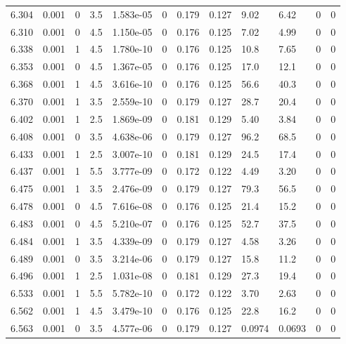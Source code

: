 \documentclass[preview]{standalone}
\begin{document}
{{{{{{\begin{tabular}{L{1.2cm}C{1.2cm} C{0.3cm}C{0.5cm} C{1.4cm}C{1.4cm} C{1.4cm}C{1.4cm} C{1.6cm}C{1.6cm} C{1.6cm}C{1.6cm}}
  6.304  &  0.001  & 0     & 3.5 &  1.583e-05  & 0  &  0.179&   0.127& 9.02 & 6.42   &  0 & 0  \\ 
  6.310  &  0.001  & 0     & 4.5 &  1.150e-05  & 0  &  0.176&   0.125& 7.02 & 4.99   &  0 & 0  \\ 
  6.338  &  0.001  & 1     & 4.5 &  1.780e-10  & 0  &  0.176&   0.125& 10.8 & 7.65   &  0 & 0  \\ 
  6.353  &  0.001  & 0     & 4.5 &  1.367e-05  & 0  &  0.176&   0.125& 17.0 & 12.1   &  0 & 0  \\ 
  6.368  &  0.001  & 1     & 4.5 &  3.616e-10  & 0  &  0.176&   0.125& 56.6 & 40.3   &  0 & 0  \\ 
  6.370  &  0.001  & 1     & 3.5 &  2.559e-10  & 0  &  0.179&   0.127& 28.7 & 20.4   &  0 & 0  \\ 
  6.402  &  0.001  & 1     & 2.5 &  1.869e-09  & 0  &  0.181&   0.129& 5.40 & 3.84   &  0 & 0  \\ 
  6.408  &  0.001  & 0     & 3.5 &  4.638e-06  & 0  &  0.179&   0.127& 96.2 & 68.5   &  0 & 0  \\ 
  6.433  &  0.001  & 1     & 2.5 &  3.007e-10  & 0  &  0.181&   0.129& 24.5 & 17.4   &  0 & 0  \\ 
  6.437  &  0.001  & 1     & 5.5 &  3.777e-09  & 0  &  0.172&   0.122& 4.49 & 3.20   &  0 & 0  \\ 
  6.475  &  0.001  & 1     & 3.5 &  2.476e-09  & 0  &  0.179&   0.127& 79.3 & 56.5   &  0 & 0  \\ 
  6.478  &  0.001  & 0     & 4.5 &  7.616e-08  & 0  &  0.176&   0.125& 21.4 & 15.2   &  0 & 0  \\ 
  6.483  &  0.001  & 0     & 4.5 &  5.210e-07  & 0  &  0.176&   0.125& 52.7 & 37.5   &  0 & 0  \\ 
  6.484  &  0.001  & 1     & 3.5 &  4.339e-09  & 0  &  0.179&   0.127& 4.58 & 3.26   &  0 & 0  \\ 
  6.489  &  0.001  & 0     & 3.5 &  3.214e-06  & 0  &  0.179&   0.127& 15.8 & 11.2   &  0 & 0  \\ 
  6.496  &  0.001  & 1     & 2.5 &  1.031e-08  & 0  &  0.181&   0.129& 27.3 & 19.4   &  0 & 0  \\ 
  6.533  &  0.001  & 1     & 5.5 &  5.782e-10  & 0  &  0.172&   0.122& 3.70 & 2.63   &  0 & 0  \\ 
  6.562  &  0.001  & 1     & 4.5 &  3.479e-10  & 0  &  0.176&   0.125& 22.8 & 16.2   &  0 & 0  \\ 
  6.563  &  0.001  & 0     & 3.5 &  4.577e-06  & 0  &  0.179&   0.127& 0.0974 & 0.0693   &  0 & 0  \\ 

\end{tabular}}}}}}}
\end{document}

